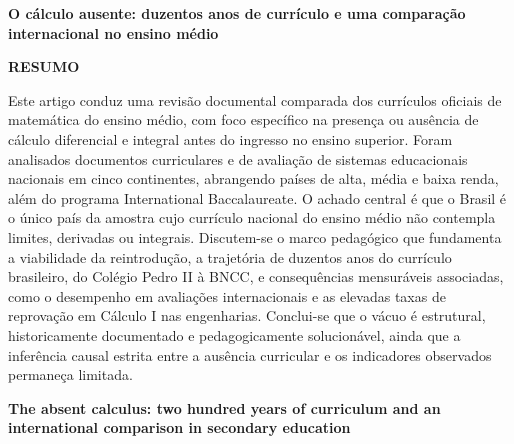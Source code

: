 \documentclass[12pt,a4paper,oneside]{article}
\begin{document}
\begin{center}
{\fontsize{14}{17}\selectfont\bfseries O cálculo ausente: duzentos anos de
currículo e uma comparação internacional no ensino médio}
\end{center}

\vspace{4pt}

\noindent\textbf{RESUMO}\\[2pt]
{\small\noindent
Este artigo conduz uma revisão documental comparada dos currículos
oficiais de matemática do ensino médio, com foco específico na presença
ou ausência de cálculo diferencial e integral antes do ingresso no
ensino superior. Foram analisados documentos curriculares e de avaliação
de sistemas educacionais nacionais em cinco continentes, abrangendo
países de alta, média e baixa renda, além do programa International
Baccalaureate. O achado central é que o Brasil é o único país da amostra
cujo currículo nacional do ensino médio não contempla limites, derivadas
ou integrais. Discutem-se o marco pedagógico que fundamenta a
viabilidade da reintrodução, a trajetória
de duzentos anos do currículo brasileiro, do Colégio Pedro II à BNCC, e
consequências mensuráveis associadas, como o desempenho em avaliações
internacionais e as elevadas taxas de reprovação em Cálculo I nas
engenharias. Conclui-se que o vácuo é estrutural, historicamente
documentado e pedagogicamente solucionável, ainda que a inferência
causal estrita entre a ausência curricular e os indicadores observados
permaneça limitada.\par}

\smallskip
{}

\medskip

\begin{center}
{\bfseries The absent calculus: two hundred years of curriculum and an
international comparison in secondary education}
\end{center}
\vspace{2pt}
\end{document}
